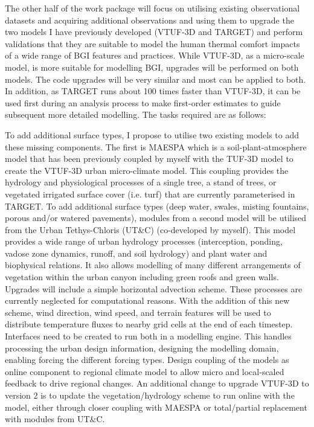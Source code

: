 The other half of the work package will focus on utilising existing observational datasets and acquiring additional observations and using them to upgrade the two models I have previously developed (VTUF-3D and TARGET) and perform validations that they are suitable to model the human thermal comfort impacts of a wide range of BGI features and practices. While VTUF-3D, as a micro-scale model, is more suitable for modelling BGI, upgrades will be performed on both models. The code upgrades will be very similar and most can be applied to both. In addition, as TARGET runs about 100 times faster than VTUF-3D, it can be used first during an analysis process to make first-order estimates to guide subsequent more detailed modelling.  The tasks required are as follows:

To add additional surface types, I propose to utilise two existing models to add these missing components. The first is MAESPA\cite{Duursma2012} which is a soil-plant-atmosphere model that has been previously coupled by myself with the TUF-3D model\cite{Krayenhoff2007} to create the VTUF-3D\cite{Nice2018a} urban micro-climate model. This coupling provides the hydrology and physiological processes of a single tree, a stand of trees, or vegetated irrigated surface cover (i.e. turf) that are currently parameterised in TARGET. To add additional surface types (deep water, swales, misting fountains, porous and/or watered pavements), modules from a second model will be utilised from the Urban Tethys-Chloris (UT\&C)\cite{Meili2020} (co-developed by myself). This model provides a wide range of urban hydrology processes (interception, ponding, vadose zone dynamics, runoff, and soil hydrology) and plant water and biophysical relations. It also allows modelling of many different arrangements of vegetation within the urban canyon including green roofs and green walls. Upgrades will include a simple horizontal advection scheme. These processes are currently neglected for computational reasons. With the addition of this new scheme, wind direction, wind speed, and terrain features will be used to distribute temperature fluxes to nearby grid cells at the end of each timestep. Interfaces need to be created to run both in a modelling engine. This handles processing the urban design information, designing the modelling domain, enabling forcing the different forcing types. Design coupling of the models as online component to regional climate model to allow micro and local-scaled feedback to drive regional changes. An additional change to upgrade VTUF-3D to version 2 is to update the vegetation/hydrology scheme to run online with the model, either through closer coupling with MAESPA\cite{Duursma2012} or total/partial replacement with modules from UT\&C\cite{Meili2020}. 






